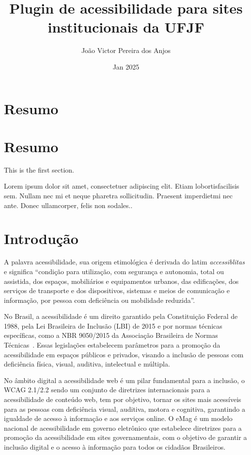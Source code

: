 \documentclass[12pt]{article}
\title{Plugin de acessibilidade para sites institucionais da UFJF}
\author{João Victor Pereira dos Anjos}
\date{Jan 2025}
\begin{document}
\maketitle

\tableofcontents

\section{Resumo}

\section{Resumo}

This is the first section.

Lorem  ipsum  dolor  sit  amet,  consectetuer  adipiscing
elit.   Etiam  lobortisfacilisis sem.  Nullam nec mi et
neque pharetra sollicitudin.  Praesent imperdietmi nec ante.
Donec ullamcorper, felis non sodales..

\section{Introdução}

A palavra acessibilidade, sua origem etimológica é derivada do latim \textit{accessiblitas}
e significa ``condição para utilização, com segurança e autonomia,
total ou assistida, dos espaços, mobiliários e equipamentos urbanos, das
edificações, dos serviços de transporte e dos dispositivos, sistemas e meios de
comunicação e informação, por pessoa com deficiência ou mobilidade reduzida''\cite{Acessibilidade}.

No Brasil, a acessibilidade é um direito garantido pela Constituição
Federal de 1988, pela Lei Brasileira de Inclusão (LBI) de 2015 \Cite{LBI}
e por normas técnicas específicas, como a NBR 9050/2015 da Associação
Brasileira de Normas Técnicas~\cite{ABNT}. Essas legislações estabelecem
parâmetros para a promoção da acessibilidade em espaços públicos e privados,
visando a inclusão de pessoas com deficiência física, visual, auditiva,
intelectual e múltipla.

No âmbito digital a acessibilidade web é um pilar fundamental para a
inclusão, o WCAG 2.1/2.2 \autocite{wcag22} sendo um conjunto de diretrizes
internacionais para a acessibilidade de conteúdo web, tem por objetivo,
tornar os sites mais acessíveis para as pessoas com deficiência visual, auditiva,
motora e cognitiva, garantindo a igualdade de acesso à informação e aos
serviços online. O eMag é um modelo nacional de acessibilidade em governo
eletrônico que estabelece diretrizes para a promoção da acessibilidade em
sites governamentais, com o objetivo de garantir a inclusão digital e o acesso
à informação para todos os cidadãos Brasileiros.
\end{document}
